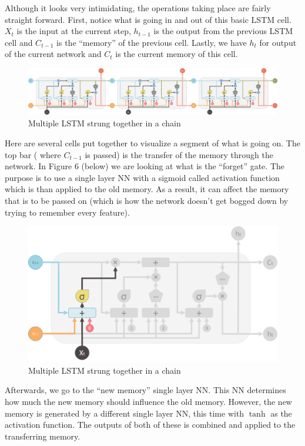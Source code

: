 \documentclass[12pt]{article}
\begin{document}
Although it looks very intimidating, the operations taking place are fairly straight forward. First, notice what is going in and out of this basic LSTM cell. $X_t$ is the input at the current step, $h_{t-1}$ is the output from the previous LSTM cell and $C_{t-1}$ is the ``memory'' of the previous cell. Lastly, we have $h_t$ for output of the current network and $C_t$ is the current memory of this cell. 

\begin{figure}[H]
  \includegraphics[width=\linewidth]{images/MultiLSTM.png}
  \caption{Multiple LSTM strung together in a chain}
\end{figure}

Here are several cells put together to visualize a segment of what is going on. The top bar ( where $C_{t-1}$ is passed) is the transfer of the memory through the network. In Figure 6 (below) we are looking at what is the ``forget'' gate. The purpose is to use a single layer NN with a sigmoid called activation function which is than applied to the old memory. As a result, it can affect the memory that is to be passed on (which is how the network doesn't get bogged down by trying to remember every feature). 

\begin{figure}[H]
  \includegraphics[width=\linewidth]{images/FirstValve.png}
  \caption{Multiple LSTM strung together in a chain}
\end{figure}

Afterwards, we go to the ``new memory'' single layer NN. This NN determines how much the new memory should influence the old memory. However, the new memory is generated by a different single layer NN, this time with $\tanh$ as the activation function. The outputs of both of these is combined and applied to the transferring memory. 
\end{document}
